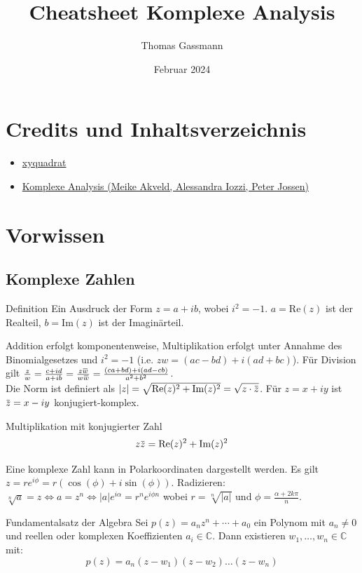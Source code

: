 \documentclass[a4paper,10pt]{article}
\title{Cheatsheet Komplexe Analysis}
\author{Thomas Gassmann}
\date{Februar 2024}
\def\C{\mathbb{C}}
\def\Re{\text{Re}}
\def\Im{\text{Im}}
\newcommand{\overbar}[1]{\mkern 1.5mu\overline{\mkern-1.5mu#1\mkern-1.5mu}\mkern 1.5mu}
\begin{document}


\section{Credits und Inhaltsverzeichnis}

\begin{itemize}
    \item \href{https://github.com/XYQuadrat/eth-cheatsheets}{xyquadrat}
    \item \href{https://people.math.ethz.ch/~iozzi/SkriptKomplexeAnalysis.pdf}{Komplexe Analysis (Meike Akveld, Alessandra Iozzi, Peter Jossen)}
\end{itemize}


\tableofcontents

\section{Vorwissen}
\subsection{Komplexe Zahlen}
\begin{mainbox}{Definition}
Ein Ausdruck der Form $z = a + ib$, wobei $i^2 = -1$. $a = \Re(z)$ ist der Realteil, $b = \Im(z)$ ist der Imaginärteil.
\end{mainbox}

Addition erfolgt komponentenweise, Multiplikation erfolgt unter Annahme des Binomialgesetzes und $i^2 = -1$ (i.e. $z w = (a c - b d) + i (a d + b  c)$). Für Division gilt $\frac{z}{w} = \frac{c + id}{a + ib} = \frac{z\overbar{w}}{w\overbar{w}} = \frac{(ca + bd) + i(ad - cb)}{a^2 + b^2}$.\\
Die Norm ist definiert als $|z| = \sqrt{\Re(z)^2 + \Im(z)^2} = \sqrt{z \cdot \overbar{z}}$. Für $z = x + iy$ ist $\overbar{z} = x - iy$ konjugiert-komplex.

\begin{subbox}{Multiplikation mit konjugierter Zahl}
$$z \overbar{z} = \Re(z)^2 + \Im(z)^2$$
\end{subbox}

Eine komplexe Zahl kann in Polarkoordinaten dargestellt werden. Es gilt $z = re^{i\phi} = r(\cos(\phi) + i\sin(\phi))$.
Radizieren: $\sqrt[n]{a} = z \iff a = z^n \iff |a| e^{i\alpha} = r^n e^{i\phi n}$ wobei $r = \sqrt[n]{|a|}$ und $\phi = \frac{\alpha + 2k\pi}{n}$.

\begin{mainbox}{Fundamentalsatz der Algebra}
  Sei $p(z) = a_n z^n + \cdots + a_0$ ein Polynom mit $a_n \neq 0$ und reellen oder komplexen Koeffizienten $a_i \in \mathbb{C}$. Dann existieren $w_1, \ldots, w_n \in \C$ mit:
  $$
    p(z) = a_n (z - w_1) (z - w_2) \ldots (z - w_n)
  $$
\end{mainbox}
\end{document}
